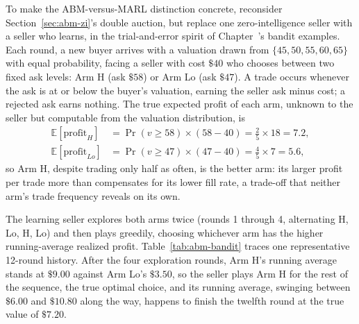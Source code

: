 \documentclass[../ai_in_finance]{subfiles}
\begin{document}
\label{sec:abm-learning-seller}

To make the ABM-versus-MARL distinction concrete, reconsider Section~\ref{sec:abm-zi}'s double auction, but replace one zero-intelligence seller with a seller who learns, in the trial-and-error spirit of Chapter~'s bandit examples. Each round, a new buyer arrives with a valuation drawn from $\{45,50,55,60,65\}$ with equal probability, facing a seller with cost $\$40$ who chooses between two fixed ask levels: Arm H (ask $\$58$) or Arm Lo (ask $\$47$). A trade occurs whenever the ask is at or below the buyer's valuation, earning the seller ask minus cost; a rejected ask earns nothing. The true expected profit of each arm, unknown to the seller but computable from the valuation distribution, is
\begin{align*}
\mathbb{E}[\text{profit}_H] &= \Pr(v\ge 58)\times(58-40) = \tfrac{2}{5}\times18 = 7.2,\\
\mathbb{E}[\text{profit}_{Lo}] &= \Pr(v\ge 47)\times(47-40) = \tfrac{4}{5}\times7 = 5.6,
\end{align*}
so Arm H, despite trading only half as often, is the better arm: its larger profit per trade more than compensates for its lower fill rate, a trade-off that neither arm's trade frequency reveals on its own.

The learning seller explores both arms twice (rounds 1 through 4, alternating H, Lo, H, Lo) and then plays greedily, choosing whichever arm has the higher running-average realized profit. Table~\ref{tab:abm-bandit} traces one representative 12-round history. After the four exploration rounds, Arm H's running average stands at $\$9.00$ against Arm Lo's $\$3.50$, so the seller plays Arm H for the rest of the sequence, the true optimal choice, and its running average, swinging between $\$6.00$ and $\$10.80$ along the way, happens to finish the twelfth round at the true value of $\$7.20$.
\end{document}
